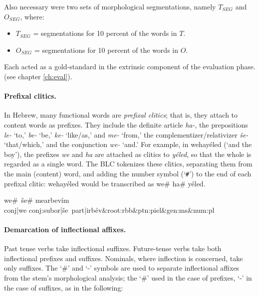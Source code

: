 Also necessary were two sets of morphological segmentations, namely $T_{SEG}$ and $O_{SEG}$, where:
\begin{itemize}
\item $T_{SEG}$ = segmentations for 10 percent of the words in $T$.
\item  $O_{SEG}$ = segmentations for 10 percent of the words in $O$.
\end{itemize}
Each acted as a gold-standard in the extrinsic 
component of the evaluation phase. (see chapter \ref{ch:eval}).  

\paragraph{Prefixal clitics.} In Hebrew, many functional words are \textit{prefixal clitics}; that is, they attach to content 
words as prefixes. They include the definite article \textit{ha-}, the prepositions \textit{le-} `to,' \textit{be-} `be,' 
\textit{ke-} `like/as,' and \textit{me-} `from,' the  complementizer/relativizer \textit{\v{s}e-} `that/which,' and the 
conjunction \textit{we-} `and.' For example,  in
\textsf{wehay\'eled} (`and the boy'), the prefixes \textit{we} and \textit{ha} are attached as clitics to \textit{y\'eled}, 
so that the whole is regarded as a single word. The \ac{BLC} tokenizes these clitics, separating them from the main (content) 
word, and adding the number symbol (`\texttt{\#}') to the end of each prefixal clitic: \textsf{wehay\'eled} 
would be transcribed as \textsf{we\# ha\# y\'eled}.

\begin{exe}\label{ex:preclitics}
	\ex
	\textsf{we\#\, \v{s}e\# mearbev\'im} \\ %
	\textsf{conj|we conj:subor|\v{s}e\, part|irb\'ev\&root:rbb\&ptn:piel\&gen:ms\&num:pl} 
\end{exe}


\paragraph{Demarcation of inflectional affixes.}
Past tense verbs take inflectional suffixes. Future-tense verbs take both inflectional prefixes and suffixes. 
Nominals, where inflection
is concerned, take only suffixes. The `\#' and `-' symbols are used to separate inflectional
affixes from the stem's morphological analysis; the `\#' used in the case of prefixes, `-' in the
case of suffixes, as in the following:

